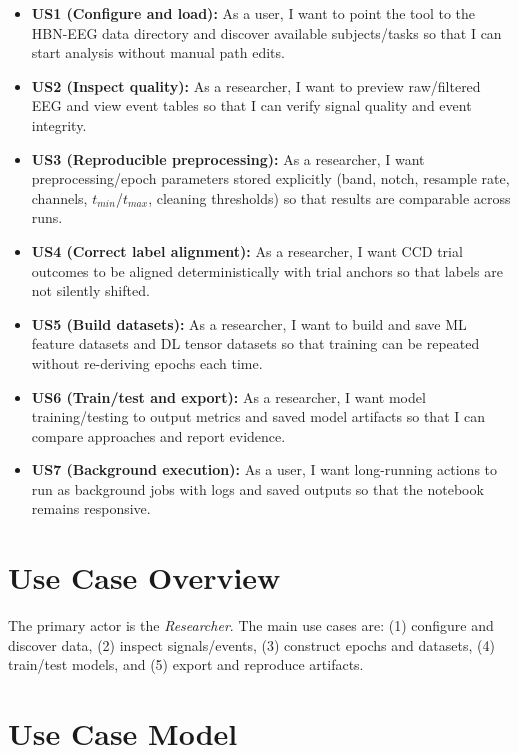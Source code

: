 \begin{itemize}[leftmargin=*]
    \item \textbf{US1 (Configure and load):} As a user, I want to point the tool to the HBN-EEG data directory and discover available subjects/tasks so that I can start analysis without manual path edits.
    \item \textbf{US2 (Inspect quality):} As a researcher, I want to preview raw/filtered EEG and view event tables so that I can verify signal quality and event integrity.
    \item \textbf{US3 (Reproducible preprocessing):} As a researcher, I want preprocessing/epoch parameters stored explicitly (band, notch, resample rate, channels, $t_{min}$/$t_{max}$, cleaning thresholds) so that results are comparable across runs.
    \item \textbf{US4 (Correct label alignment):} As a researcher, I want CCD trial outcomes to be aligned deterministically with trial anchors so that labels are not silently shifted.
    \item \textbf{US5 (Build datasets):} As a researcher, I want to build and save ML feature datasets and DL tensor datasets so that training can be repeated without re-deriving epochs each time.
    \item \textbf{US6 (Train/test and export):} As a researcher, I want model training/testing to output metrics and saved model artifacts so that I can compare approaches and report evidence.
    \item \textbf{US7 (Background execution):} As a user, I want long-running actions to run as background jobs with logs and saved outputs so that the notebook remains responsive.
\end{itemize}

\section{Use Case Overview}
\label{sec:use-case-overview}

The primary actor is the \textit{Researcher}. The main use cases are: (1) configure and discover data, (2) inspect signals/events, (3) construct epochs and datasets, (4) train/test models, and (5) export and reproduce artifacts.

\section{Use Case Model}
\label{sec:use-case-model}

